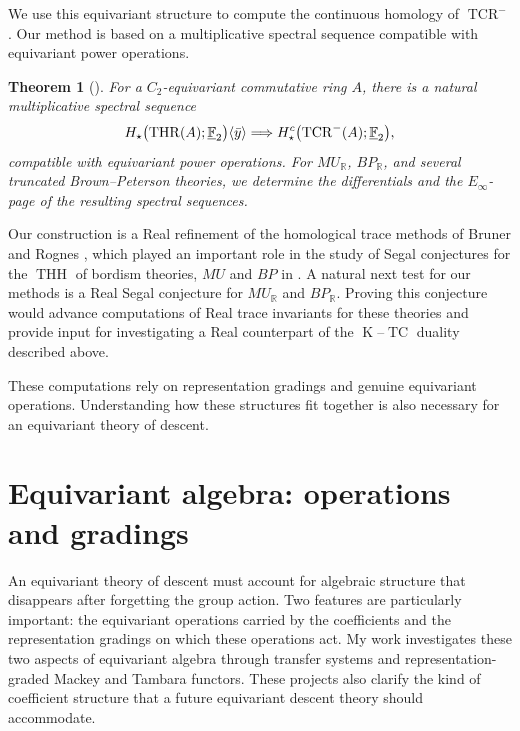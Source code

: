 \documentclass[11pt]{article}
\newtheorem{theorem}{Theorem}
\newcommand{\K}{\operatorname{K}}
\newcommand{\THH}{\operatorname{THH}}
\begin{document}
We use this equivariant structure to compute the continuous homology of $\operatorname{TCR}^-$ \cite{QS22}.
Our method is based on a multiplicative spectral sequence compatible with equivariant power operations.
\begin{theorem}[\cite{CGKMQ}]
For a $C_2$-equivariant commutative ring $A$, there is a
natural multiplicative spectral sequence
\[
H_\star\bigl(\operatorname{THR}(A); \underline{\mathbb{F}}_2\bigr)\langle \bar y\rangle
\Longrightarrow
H^c_\star\bigl(\operatorname{TCR}^-(A); \underline{\mathbb{F}}_2\bigr),
\]
compatible with equivariant power operations.
For $MU_{\mathbb R}$, $BP_{\mathbb R}$, and several truncated
Brown--Peterson theories, we determine the differentials and the $E_\infty$-page of the resulting spectral sequences.
\end{theorem}

Our construction is a Real refinement of the homological trace methods of Bruner and Rognes \cite{MR2153113}, which played an important role in the study of Segal conjectures for the $\THH$ of bordism theories, $MU$ and $BP$ in \cite{MR2832570}.
A natural next test for our methods is a Real Segal conjecture for $MU_{\mathbb R}$ and $BP_{\mathbb R}$.
Proving this conjecture would advance computations of Real trace invariants for these theories and provide input for investigating a Real counterpart of the $\K$--$\operatorname{TC}$ duality described above.

These computations rely on representation gradings and genuine equivariant operations.
Understanding how these structures fit together is also necessary for an equivariant theory of descent.

\section{Equivariant algebra: operations and gradings}
An equivariant theory of descent must account for algebraic structure that disappears after forgetting the group action.
Two features are particularly important: the equivariant operations carried by the coefficients and the representation gradings on which these operations act.
My work investigates these two aspects of equivariant algebra through transfer systems and representation-graded Mackey and Tambara functors.
These projects also clarify the kind of coefficient structure that a future equivariant descent theory should accommodate.
\end{document}
